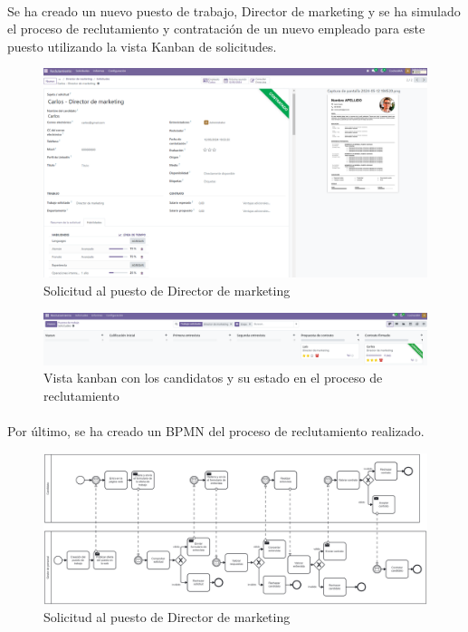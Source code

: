 \paragraph{}
Se ha creado un nuevo puesto de trabajo, Director de marketing y se ha simulado el proceso de reclutamiento y contratación de un nuevo empleado para este puesto utilizando la vista Kanban de solicitudes.
\begin{figure}[h]
    \centering
    \includegraphics[width=1\linewidth]{fotosGestPers/reclutamiento.png}
    \caption{Solicitud al puesto de Director de marketing}
    \label{fig:enter-label}
\end{figure}
\begin{figure}[h]
    \centering
    \includegraphics[width=1\linewidth]{fotosGestPers/kanban.png}
    \caption{Vista kanban con los candidatos y su estado en el proceso de reclutamiento}
    \label{fig:enter-label}
\end{figure}
\paragraph{}
Por último, se ha creado un BPMN del proceso de reclutamiento realizado.
\begin{figure}[h]
    \centering
    \includegraphics[width=1\linewidth]{bpmn/gestPers.png}
    \caption{Solicitud al puesto de Director de marketing}
    \label{fig:enter-label}
\end{figure}

